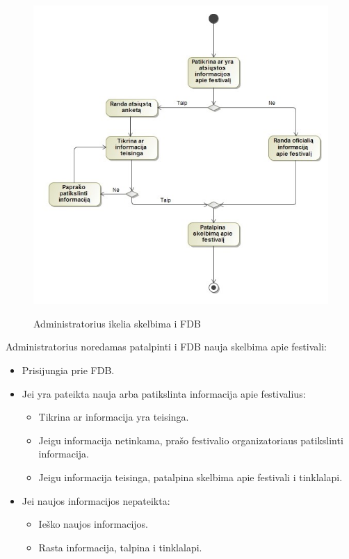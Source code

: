 ﻿\documentclass{VUMIFPSkursinis}
\begin{document}
\begin{figure}[H]
    \centering
    \includegraphics[scale=0.7]{img/geri/adminSkelb}
    \label{img:uml16}
	\caption{Administratorius ikelia skelbima i FDB}
\end{figure}

Administratorius noredamas patalpinti i FDB nauja skelbima apie festivali:
\begin{itemize}
\item Prisijungia prie FDB.
\item Jei yra pateikta nauja arba patikslinta informacija apie festivalius:
\begin{itemize}
\item Tikrina ar informacija yra teisinga.
\item Jeigu informacija netinkama, prašo festivalio organizatoriaus patikslinti informacija.
\item Jeigu informacija teisinga, patalpina skelbima apie festivali i tinklalapi.
\end{itemize}
\item Jei naujos informacijos nepateikta:
\begin{itemize}
\item Ieško naujos informacijos.
\item Rasta informacija, talpina i tinklalapi.
\end{itemize}
\end{itemize}
\end{document}
